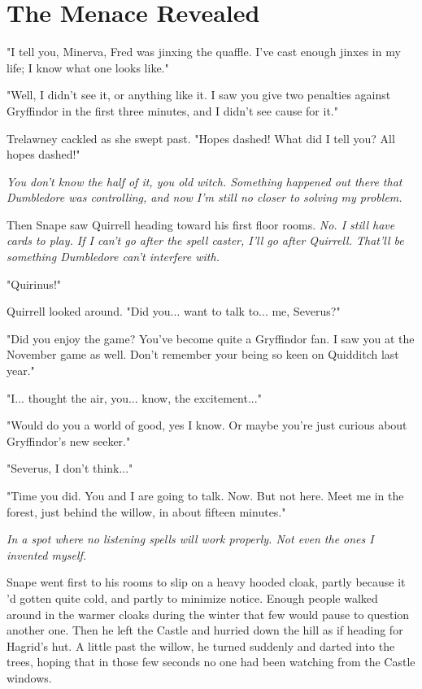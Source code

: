 
\chapter{The Menace Revealed}

"I tell you, Minerva, Fred was jinxing the quaffle. I've cast enough jinxes in my life; I know what one looks like."

"Well, I didn't see it, or anything like it. I saw you give two penalties against Gryffindor in the first three minutes, and I didn't see cause for it."

Trelawney cackled as she swept past. "Hopes dashed! What did I tell you? All hopes dashed!"

\emph{You don't know the half of it, you old witch. Something happened out there that Dumbledore was controlling, and now I'm still no closer to solving my problem.}

Then Snape saw Quirrell heading toward his first floor rooms. \emph{No. I still have cards to play. If I can't go after the spell caster, I'll go after Quirrell. That'll be something Dumbledore can't interfere with.}

"Quirinus!"

Quirrell looked around. "Did you... want to talk to... me, Severus?"

"Did you enjoy the game? You've become quite a Gryffindor fan. I saw you at the November game as well. Don't remember your being so keen on Quidditch last year."

"I... thought the air, you... know, the excitement..."

"Would do you a world of good, yes I know. Or maybe you're just curious about Gryffindor's new seeker."

"Severus, I don't think..."

"Time you did. You and I are going to talk. Now. But not here. Meet me in the forest, just behind the willow, in about fifteen minutes."

\emph{In a spot where no listening spells will work properly. Not even the ones I invented myself.}

Snape went first to his rooms to slip on a heavy hooded cloak, partly because it 'd gotten quite cold, and partly to minimize notice. Enough people walked around in the warmer cloaks during the winter that few would pause to question another one. Then he left the Castle and hurried down the hill as if heading for Hagrid's hut. A little past the willow, he turned suddenly and darted into the trees, hoping that in those few seconds no one had been watching from the Castle windows.

